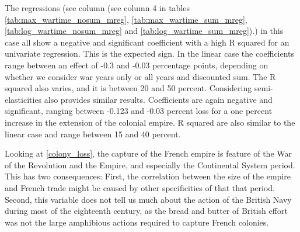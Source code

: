 \documentclass[12pt,a4paper,notitlepage,english]{article}
\begin{document}
The regressions (see column (see column 4 in tables \ref{tab:max_wartime_nosum_mreg},  \ref{tab:max_wartime_sum_mreg}, \ref{tab:log_wartime_nosum_mreg} and   \ref{tab:log_wartime_sum_mreg}).) in this case all show a negative and significant coefficient with a high R squared for an univariate regression.
This is the expected sign.
In the linear case the coefficients range between an effect of -0.3 and -0.03 percentage points, depending on whether we consider war years only or all years and discounted sum.
The R squared also varies, and it is between 20 and 50 percent.
Considering semi-elasticities also provides similar results.
Coefficients are again negative and significant, ranging between -0.123 and -0.03 percent loss for a one percent increase in the extension of the colonial empire.
R squared are also similar to the linear case and range between 15 and 40 percent.

\begin{landscape}
	
\end{landscape}
\begin{landscape}
	
\end{landscape}
\begin{landscape}
	
\end{landscape}
\begin{landscape}
	
\end{landscape}
\begin{landscape}
	
\end{landscape}
\begin{landscape}
	
\end{landscape}

Looking at \ref{colony_loss}, the capture of the French empire is feature of the War of the Revolution and the Empire, and especially the Continental System period.
This has two consequences:
First, the correlation between the size of the empire and French trade might be caused by other specificities of that that period.
Second, this variable does not tell us much about the action of the British Navy during most of the eighteenth century, as the bread and butter of British effort was not the large amphibious actions required to capture French colonies.

\end{document}
